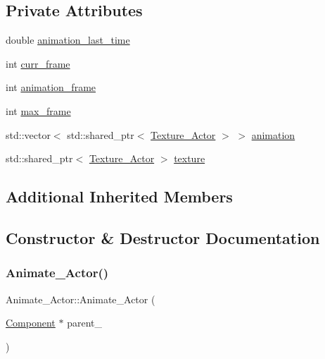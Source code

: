 \subsection*{Private Attributes}
\begin{DoxyCompactItemize}
\item 
double \hyperlink{classAnimate__Actor_aaec5373c6b5361d9b4281b07269f168a}{animation\+\_\+last\+\_\+time}
\item 
int \hyperlink{classAnimate__Actor_a6ca33dd363ec6295bac6d811dc22ba47}{curr\+\_\+frame}
\item 
int \hyperlink{classAnimate__Actor_acd36b7c0f4ebdac9d7f5672be523f27c}{animation\+\_\+frame}
\item 
int \hyperlink{classAnimate__Actor_a40951dd58ee9db94c4d9c2f8c761c185}{max\+\_\+frame}
\item 
std\+::vector$<$ std\+::shared\+\_\+ptr$<$ \hyperlink{classTexture__Actor}{Texture\+\_\+\+Actor} $>$ $>$ \hyperlink{classAnimate__Actor_aa4b98466c47863249c944ac660712101}{animation}
\item 
std\+::shared\+\_\+ptr$<$ \hyperlink{classTexture__Actor}{Texture\+\_\+\+Actor} $>$ \hyperlink{classAnimate__Actor_a48a940cb5632d01a6aedd57ed3a0d992}{texture}
\end{DoxyCompactItemize}
\subsection*{Additional Inherited Members}


\subsection{Constructor \& Destructor Documentation}
\mbox{\label{classAnimate__Actor_aee4a76bfca6d5f49f880f20e23e968bc}} 
\subsubsection{\texorpdfstring{Animate\+\_\+\+Actor()}{Animate\_Actor()}}
{\footnotesize\ttfamily Animate\+\_\+\+Actor\+::\+Animate\+\_\+\+Actor (\begin{DoxyParamCaption}\item[{\hyperlink{classComponent}{Component} $\ast$}]{parent\+\_\+ }\end{DoxyParamCaption})}

